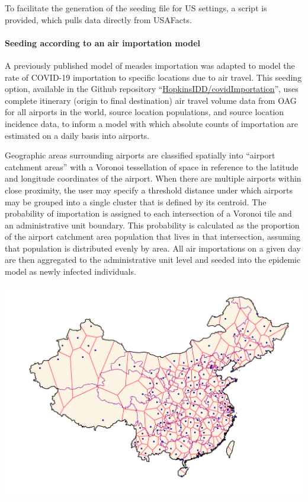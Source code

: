 To facilitate the generation of the seeding file for US settings,  a script is provided, which pulls data directly from USAFacts. 

\paragraph{Seeding according to an air importation model} A previously published model of measles importation was adapted to model the rate of COVID-19 importation to specific locations due to air travel\cite{Truelove:EpidemicsAirTravel:2020}. This seeding option, available in the Github repository “\url{HopkinsIDD/covidImportation}”\cite{Truelove:HopkinsIDDCovidImportationInitial:2020}, uses complete itinerary (origin to final destination) air travel volume data from OAG\cite{OAG:FlightDataOAG:2020} for all airports in the world, source location populations, and source location incidence data, to inform a model with which absolute counts of importation are estimated on a daily basis into airports. 

Geographic areas surrounding airports are classified spatially into “airport catchment areas” with a Voronoi tessellation of space in reference to the latitude and longitude coordinates of the airport\cite{Balcan:ModelingSpatialSpread:2010}. When there are multiple airports within close proximity, the user may specify a threshold distance under which airports may be grouped into a single cluster that is defined by its centroid. The probability of importation is assigned to each intersection of a Voronoi tile and an administrative unit boundary. This probability is calculated as the proportion of the airport catchment area population that lives in that intersection, assuming that population is distributed evenly by area. All air importations on a given day are then aggregated to the administrative unit level and seeded into the epidemic model as newly infected individuals.

 \begin{marginfigure}[-2\baselineskip]
\centering
\includegraphics{fig_pipeline/airport_tessellation.pdf}
\label{fig:rain}
\end{marginfigure}

